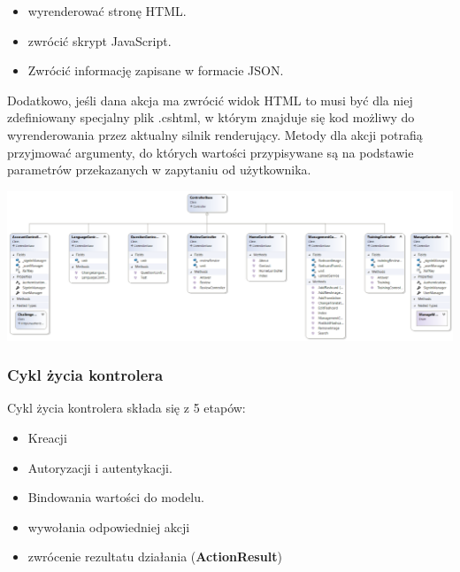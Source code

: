 \begin{itemize}
	\item wyrenderować stronę HTML.
	\item zwrócić skrypt JavaScript.
	\item Zwrócić informację zapisane w formacie JSON.
\end{itemize}

Dodatkowo, jeśli dana akcja ma zwrócić widok HTML to musi być dla niej zdefiniowany specjalny plik .cshtml, w którym znajduje się kod możliwy do wyrenderowania przez aktualny silnik renderujący. 
Metody dla akcji potrafią przyjmować argumenty, do których wartości przypisywane są na podstawie parametrów przekazanych w zapytaniu od użytkownika. 
\begin{landscape}
\begin{center}
	\includegraphics[width=\paperwidth]{images/Controllers.png}
\end{center}
\end{landscape}

\subsubsection{Cykl życia kontrolera}

Cykl życia kontrolera składa się z 5 etapów:
\begin{itemize}
	\item Kreacji
	\item Autoryzacji i autentykacji.
	\item Bindowania wartości do modelu.
	\item wywołania odpowiedniej akcji
	\item zwrócenie rezultatu działania (\textbf{ActionResult})
\end{itemize}


